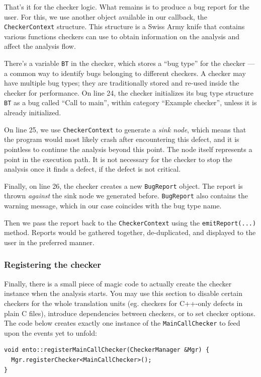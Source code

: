 \documentclass[a4paper,12pt]{article}
\newenvironment{nobr}{\begin{minipage}{\textwidth}\setlength\parskip{1em}
}{\end{minipage}\ignorespacesafterend}
\begin{document}
That's it for the checker logic. What remains is to produce a bug report for the user. For this, we use another object available in our callback, the \lstinline|CheckerContext| structure. This structure is a Swiss Army knife that contains various functions checkers can use to obtain information on the analysis and affect the analysis flow.

There's a variable \lstinline|BT| in the checker, which stores a ``bug type'' for the checker --- a common way to identify bugs belonging to different checkers. A checker may have multiple bug types; they are traditionally stored and re-used inside the checker for performance. On line 24, the checker initializes its bug type structure \lstinline|BT| as a bug called ``Call to main'', within category ``Example checker'', unless it is already initialized.

On line 25, we use \lstinline|CheckerContext| to generate a \emph{sink node}, which means that the program would most likely crash after encountering this defect, and it is pointless to continue the analysis beyond this point. The node itself represents a point in the execution path. It is not necessary for the checker to stop the analysis once it finds a defect, if the defect is not critical.

Finally, on line 26, the checker creates a new \lstinline|BugReport| object. The report is thrown \emph{against} the sink node we generated before. \lstinline|BugReport| also contains the warning message, which in our case coincides with the bug type name.

Then we pass the report back to the \lstinline|CheckerContext| using the \lstinline|emitReport(...)| method. Reports would be gathered together, de-duplicated, and displayed to the user in the preferred manner.

\begin{nobr}
\subsubsection{Registering the checker}

Finally, there is a small piece of magic code to actually create the checker instance when the analysis starts. You may use this section to disable certain checkers for the whole translation units (eg. checkers  for C++-only defects in plain C files), introduce dependencies between checkers, or to set checker options. The code below creates exactly one instance of the \lstinline|MainCallChecker| to feed upon the events yet to unfold:

\begin{lstlisting}[style=cplusplus,firstnumber=31]
void ento::registerMainCallChecker(CheckerManager &Mgr) {
  Mgr.registerChecker<MainCallChecker>();
}
\end{lstlisting}
\end{nobr}
\end{document}
